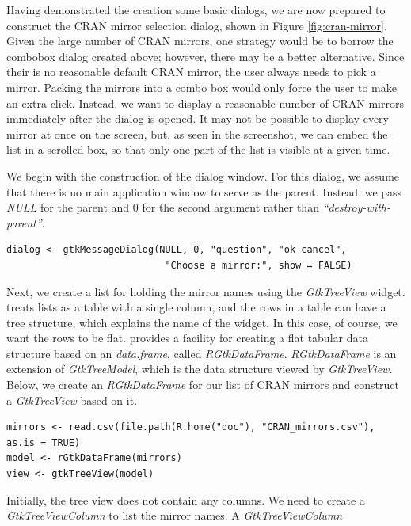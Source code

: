 \documentclass[article]{jss}
\begin{document}
Having demonstrated the creation some basic dialogs, we are now prepared to 
construct the CRAN mirror selection dialog, shown
in Figure \ref{fig:cran-mirror}.
Given the large number of CRAN mirrors, one strategy would be to 
borrow the combobox dialog created above; however, there may be a better 
alternative. Since their is no reasonable default CRAN mirror, the user always
needs to pick a mirror. Packing the mirrors into a combo box would only force 
the user to make an extra click. Instead, we want to display a reasonable
number of CRAN mirrors immediately after the dialog is opened. It may
not be possible to display every mirror at once on the screen, but, as seen
in the screenshot, we can embed the list in a scrolled box, so that only
one part of the list is visible at a given time.

We begin with the construction of the dialog window. For this dialog, we 
assume that there is no main application window to serve as the
parent. 
Instead, we pass \emph{NULL} for the parent and $0$ for the second argument 
rather than \emph{``destroy-with-parent''}.
\begin{verbatim}
dialog <- gtkMessageDialog(NULL, 0, "question", "ok-cancel", 
                            "Choose a mirror:", show = FALSE)
\end{verbatim}
Next, we create a list for holding the mirror names using the \emph{GtkTreeView}
widget.  treats lists as a table with a single column, and the rows in
a table can have a tree structure, which explains the name of the widget.
In this case, of course, we want the rows to be flat.  provides a 
facility for creating a flat tabular data structure based on an 
\emph{data.frame}, called \emph{RGtkDataFrame}. \emph{RGtkDataFrame} is
an extension of \emph{GtkTreeModel}, which is the data structure viewed by
\emph{GtkTreeView}. Below, we create an \emph{RGtkDataFrame} for our list
of CRAN mirrors and construct a \emph{GtkTreeView} based on it.
\begin{verbatim}
mirrors <- read.csv(file.path(R.home("doc"), "CRAN_mirrors.csv"), as.is = TRUE)
model <- rGtkDataFrame(mirrors)
view <- gtkTreeView(model)
\end{verbatim}
Initially, the tree view does not contain any columns. We need to
create a \emph{GtkTreeViewColumn} to list the mirror names. A \emph{GtkTreeViewColumn}
\end{document}
